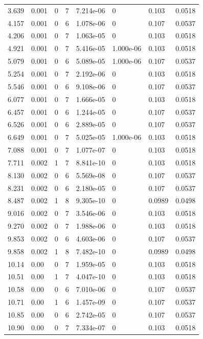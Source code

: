\documentclass[preview]{standalone}
\begin{document}
{{\begin{tabular}{L{1.2cm}C{1.2cm} C{0.3cm}C{0.5cm} C{1.4cm}C{1.4cm} C{1.4cm}C{1.4cm}}
  3.639  &  0.001  & 0     &  7 &  7.214e-06  & 0  & 0.103 &  0.0518   \\ 
  4.157  &  0.001  & 0     &  6 &  1.078e-06  & 0  & 0.107 &  0.0537   \\ 
  4.206  &  0.001  & 0     &  7 &  1.063e-05  & 0  & 0.103 &  0.0518   \\ 
  4.921  &  0.001  & 0     &  7 &  5.416e-05  & 1.000e-06  & 0.103 &  0.0518   \\ 
  5.079  &  0.001  & 0     &  6 &  5.089e-05  & 1.000e-06  & 0.107 &  0.0537   \\ 
  5.254  &  0.001  & 0     &  7 &  2.192e-06  & 0  & 0.103 &  0.0518   \\ 
  5.546  &  0.001  & 0     &  6 &  9.108e-06  & 0  & 0.107 &  0.0537   \\ 
  6.077  &  0.001  & 0     &  7 &  1.666e-05  & 0  & 0.103 &  0.0518   \\ 
  6.457  &  0.001  & 0     &  6 &  1.244e-05  & 0  & 0.107 &  0.0537   \\ 
  6.526  &  0.001  & 0     &  6 &  2.889e-05  & 0  & 0.107 &  0.0537   \\ 
  6.649  &  0.001  & 0     &  7 &  5.025e-05  & 1.000e-06  & 0.103 &  0.0518   \\ 
  7.088  &  0.001  & 0     &  7 &  1.077e-07  & 0  & 0.103 &  0.0518   \\ 
  7.711  &  0.002  & 1     &  7 &  8.841e-10  & 0  & 0.103 &  0.0518   \\ 
  8.130  &  0.002  & 0     &  6 &  5.569e-08  & 0  & 0.107 &  0.0537   \\ 
  8.231  &  0.002  & 0     &  6 &  2.180e-05  & 0  & 0.107 &  0.0537   \\ 
  8.487  &  0.002  & 1     &  8 &  9.305e-10  & 0  & 0.0989 &  0.0498   \\ 
  9.016  &  0.002  & 0     &  7 &  3.546e-06  & 0  & 0.103 &  0.0518   \\ 
  9.270  &  0.002  & 0     &  7 &  1.988e-06  & 0  & 0.103 &  0.0518   \\ 
  9.853  &  0.002  & 0     &  6 &  4.603e-06  & 0  & 0.107 &  0.0537   \\ 
  9.858  &  0.002  & 1     &  8 &  7.482e-10  & 0  & 0.0989 &  0.0498   \\ 
  10.14  &  0.00  & 0     &  7 &  1.959e-05  & 0  & 0.103 &  0.0518   \\ 
  10.51  &  0.00  & 1     &  7 &  4.047e-10  & 0  & 0.103 &  0.0518   \\ 
  10.58  &  0.00  & 0     &  6 &  7.010e-06  & 0  & 0.107 &  0.0537   \\ 
  10.71  &  0.00  & 1     &  6 &  1.457e-09  & 0  & 0.107 &  0.0537   \\ 
  10.85  &  0.00  & 0     &  6 &  2.742e-05  & 0  & 0.107 &  0.0537   \\ 
  10.90  &  0.00  & 0     &  7 &  7.334e-07  & 0  & 0.103 &  0.0518   \\ 
\hline 
\end{tabular} 

}}
\end{document}
